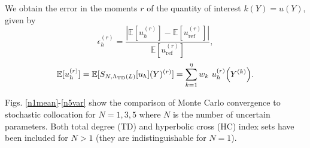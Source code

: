 \documentclass{anstrans}
\newcommand{\expv}[1]{\ensuremath{\mathbb{E}[ #1]}}
\begin{document}
We obtain the error in the moments $r$ of the quantity of interest $k(Y)=u(Y)$, given by
\begin{equation}
\epsilon_h^{(r)}=\frac{|\expv{u_h^{(r)}}-\expv{u_\text{ref}^{(r)}}|}{\expv{u_\text{ref}^{(r)}}},
\end{equation}
\begin{equation}
\expv{u_h^{(r)}}=\expv{S_{N,\Lambda_\text{TD}(L)}[u_h](Y)^{(r)}}=\sum_{k=1}^\eta w_k ~u_h^{(r)}\qty(Y^{(k)}).
\end{equation}

Figs. \ref{n1mean}-\ref{n5var} show the comparison of Monte Carlo convergence to stochastic collocation for $N=1,3,5$ where $N$ is the number of uncertain parameters.  Both total degree (TD) and hyperbolic cross (HC) index sets have been included for $N>1$ (they are indistinguishable for $N=1$).
\end{document}
